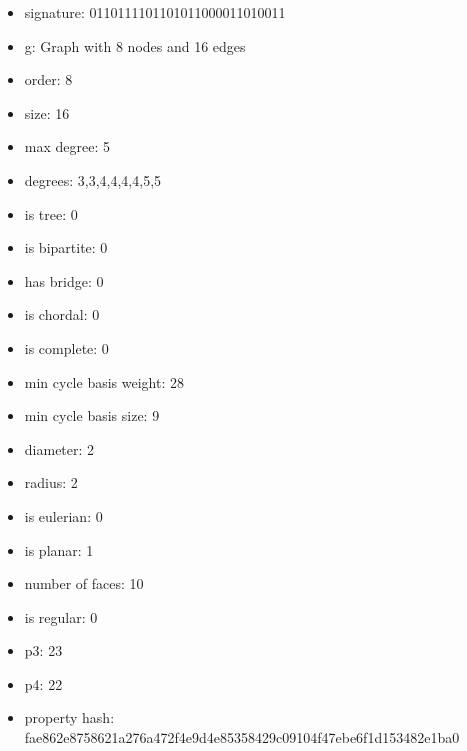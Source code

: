 \begin{itemize}
\item signature: 0110111101101011000011010011
\item g: Graph with 8 nodes and 16 edges
\item order: 8
\item size: 16
\item max degree: 5
\item degrees: 3,3,4,4,4,4,5,5
\item is tree: 0
\item is bipartite: 0
\item has bridge: 0
\item is chordal: 0
\item is complete: 0
\item min cycle basis weight: 28
\item min cycle basis size: 9
\item diameter: 2
\item radius: 2
\item is eulerian: 0
\item is planar: 1
\item number of faces: 10
\item is regular: 0
\item p3: 23
\item p4: 22
\item property hash: fae862e8758621a276a472f4e9d4e85358429c09104f47ebe6f1d153482e1ba0
\end{itemize}
\newpage
\begin{figure}
\end{figure}
